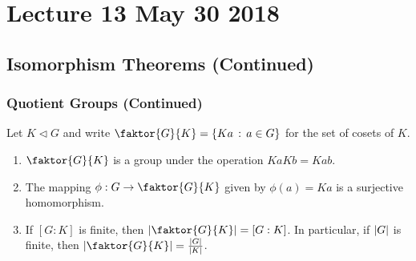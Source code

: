 \chapter{Lecture 13 May 30 2018}%
\label{chp:lecture_13_may_30_2018}

\section{Isomorphism Theorems (Continued)}%
\label{sec:isomorphism_theorems_continued}

\subsection{Quotient Groups (Continued)}%
\label{sub:quotient_groups_continued}

\begin{propo}
\label{propo:propo_related_to_quotient_groups}
  Let $K \triangleleft G$ and write $\faktor{G}{K} = \{Ka \, : \, a \in G\}$ for the set of cosets of $K$.
  \begin{enumerate}
    \item $\faktor{G}{K}$ is a group under the operation $Ka Kb = Kab$.
    \item The mapping $\phi : G \to \faktor{G}{K}$ given by $\phi(a) = Ka$ is a surjective homomorphism.
    \item If $[G : K]$ is finite, then $\abs{\faktor{G}{K}} = [G : K]$. In particular, if $\left|G\right|$ is finite, then $\abs{\faktor{G}{K}} = \frac{\abs{G}}{\abs{K}}$.
  \end{enumerate}
\end{propo}

